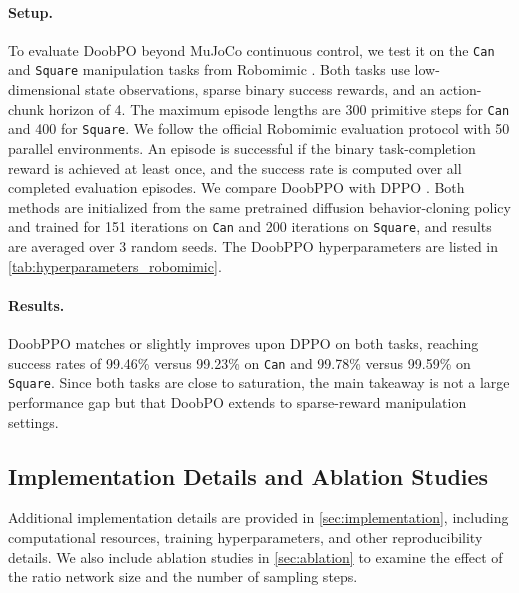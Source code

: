 \paragraph{Setup.}
To evaluate DoobPO beyond MuJoCo continuous control, we test it on the \texttt{Can} and \texttt{Square} manipulation tasks from Robomimic \cite{mandlekar2021matters}.
Both tasks use low-dimensional state observations, sparse binary success rewards, and an action-chunk horizon of 4.
The maximum episode lengths are 300 primitive steps for \texttt{Can} and 400 for \texttt{Square}.
We follow the official Robomimic evaluation protocol with 50 parallel environments.
An episode is successful if the binary task-completion reward is achieved at least once, and the success rate is computed over all completed evaluation episodes.
We compare DoobPPO with DPPO \cite{ren2024diffusion}.
Both methods are initialized from the same pretrained diffusion behavior-cloning policy and trained for 151 iterations on \texttt{Can} and 200 iterations on \texttt{Square}, and results are averaged over 3 random seeds.
The DoobPPO hyperparameters are listed in \cref{tab:hyperparameters_robomimic}.

\paragraph{Results.}
DoobPPO matches or slightly improves upon DPPO on both tasks, reaching success rates of 99.46\% versus 99.23\% on \texttt{Can} and 99.78\% versus 99.59\% on \texttt{Square}.
Since both tasks are close to saturation, the main takeaway is not a large performance gap but that DoobPO extends to sparse-reward manipulation settings.

\subsection{Implementation Details and Ablation Studies}

Additional implementation details are provided in \cref{sec:implementation}, including computational resources, training hyperparameters, and other reproducibility details.
We also include ablation studies in \cref{sec:ablation} to examine the effect of the ratio network size and the number of sampling steps.